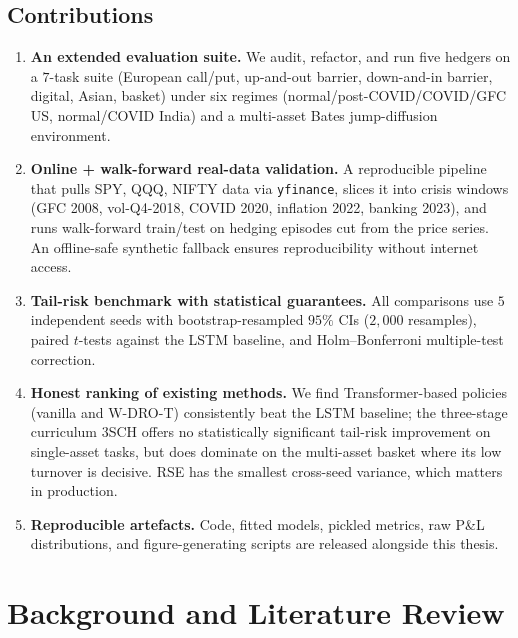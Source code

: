\documentclass[11pt,a4paper]{article}
\begin{document}
\subsection{Contributions}

\begin{enumerate}[leftmargin=*]
\item \textbf{An extended evaluation suite.}  We audit, refactor, and run
  five hedgers on a $7$-task suite (European call/put, up-and-out barrier,
  down-and-in barrier, digital, Asian, basket) under six regimes
  (normal/post-COVID/COVID/GFC US, normal/COVID India) and a multi-asset
  Bates jump-diffusion environment.

\item \textbf{Online + walk-forward real-data validation.}  A reproducible
  pipeline that pulls SPY, QQQ, NIFTY data via \texttt{yfinance}, slices it
  into crisis windows (GFC 2008, vol-Q4-2018, COVID 2020, inflation 2022,
  banking 2023), and runs walk-forward train/test on hedging episodes
  cut from the price series.  An offline-safe synthetic fallback ensures
  reproducibility without internet access.

\item \textbf{Tail-risk benchmark with statistical guarantees.}  All
  comparisons use $5$ independent seeds with bootstrap-resampled $95\%$
  CIs ($2{,}000$ resamples), paired $t$-tests against the LSTM baseline,
  and Holm--Bonferroni multiple-test correction.

\item \textbf{Honest ranking of existing methods.}  We find Transformer-based
  policies (vanilla and W-DRO-T) consistently beat the LSTM baseline; the
  three-stage curriculum 3SCH offers no statistically significant tail-risk
  improvement on single-asset tasks, but does dominate on the multi-asset
  basket where its low turnover is decisive.  RSE has the smallest
  cross-seed variance, which matters in production.

\item \textbf{Reproducible artefacts.}  Code, fitted models, pickled
  metrics, raw P\&L distributions, and figure-generating scripts are
  released alongside this thesis.
\end{enumerate}

\section{Background and Literature Review}\label{sec:lit}
\end{document}
